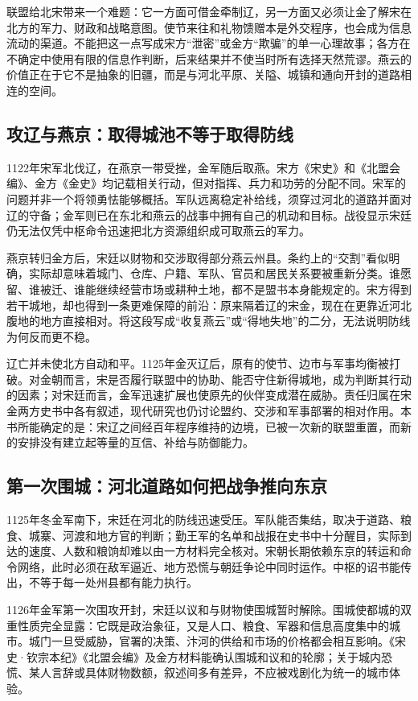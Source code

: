 联盟给北宋带来一个难题：它一方面可借金牵制辽，另一方面又必须让金了解宋在北方的军力、财政和战略意图。使节来往和礼物馈赠本是外交程序，也会成为信息流动的渠道。不能把这一点写成宋方“泄密”或金方“欺骗”的单一心理故事；各方在不确定中使用有限的信息作判断，后来结果并不使当时所有选择天然荒谬。燕云的价值正在于它不是抽象的旧疆，而是与河北平原、关隘、城镇和通向开封的道路相连的空间。

\subsection{攻辽与燕京：取得城池不等于取得防线}

1122年宋军北伐辽，在燕京一带受挫，金军随后取燕。宋方《宋史》和《北盟会编》、金方《金史》均记载相关行动，但对指挥、兵力和功劳的分配不同。宋军的问题并非一个将领勇怯能够概括。军队远离稳定补给线，须穿过河北的道路并面对辽的守备；金军则已在东北和燕云的战事中拥有自己的机动和目标。战役显示宋廷仍无法仅凭中枢命令迅速把北方资源组织成可取燕云的军力。

燕京转归金方后，宋廷以财物和交涉取得部分燕云州县。条约上的“交割”看似明确，实际却意味着城门、仓库、户籍、军队、官员和居民关系要被重新分类。谁愿留、谁被迁、谁能继续经营市场或耕种土地，都不是盟书本身能规定的。宋方得到若干城地，却也得到一条更难保障的前沿：原来隔着辽的宋金，现在在更靠近河北腹地的地方直接相对。将这段写成“收复燕云”或“得地失地”的二分，无法说明防线为何反而更不稳。

辽亡并未使北方自动和平。1125年金灭辽后，原有的使节、边市与军事均衡被打破。对金朝而言，宋是否履行联盟中的协助、能否守住新得城地，成为判断其行动的因素；对宋廷而言，金军迅速扩展也使原先的伙伴变成潜在威胁。责任归属在宋金两方史书中各有叙述，现代研究也仍讨论盟约、交涉和军事部署的相对作用。本书所能确定的是：宋辽之间经百年程序维持的边境，已被一次新的联盟重置，而新的安排没有建立起等量的互信、补给与防御能力。

\subsection{第一次围城：河北道路如何把战争推向东京}

1125年冬金军南下，宋廷在河北的防线迅速受压。军队能否集结，取决于道路、粮食、城寨、河渡和地方官的判断；勤王军的名单和战报在史书中十分醒目，实际到达的速度、人数和粮饷却难以由一方材料完全核对。宋朝长期依赖东京的转运和命令网络，此时必须在敌军逼近、地方恐慌与朝廷争论中同时运作。中枢的诏书能传出，不等于每一处州县都有能力执行。

1126年金军第一次围攻开封，宋廷以议和与财物使围城暂时解除。围城使都城的双重性质完全显露：它既是政治象征，又是人口、粮食、军器和信息高度集中的城市。城门一旦受威胁，官署的决策、汴河的供给和市场的价格都会相互影响。《宋史·钦宗本纪》《北盟会编》及金方材料能确认围城和议和的轮廓；关于城内恐慌、某人言辞或具体财物数额，叙述间多有差异，不应被戏剧化为统一的城市体验。

